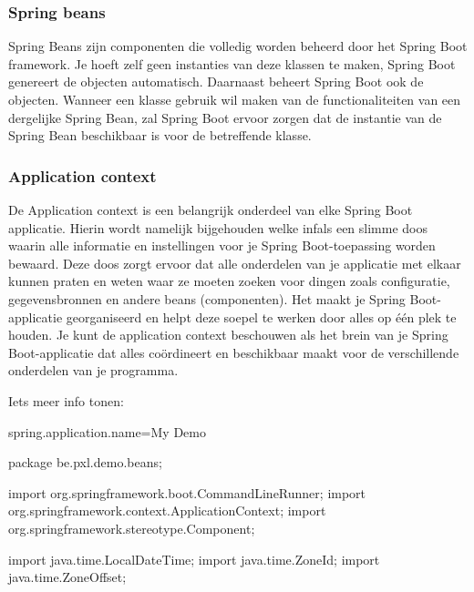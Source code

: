 \subsubsection{Spring beans}

Spring Beans zijn componenten die volledig worden beheerd door het Spring Boot framework. Je hoeft zelf geen instanties van deze klassen te maken, Spring Boot genereert de objecten automatisch.  Daarnaast beheert Spring Boot ook de objecten. Wanneer een klasse gebruik wil maken van de functionaliteiten van een dergelijke Spring Bean, zal Spring Boot ervoor zorgen dat de instantie van de Spring Bean beschikbaar is voor de betreffende klasse.

\subsubsection{Application context}

De Application context is een belangrijk onderdeel van elke Spring Boot applicatie.
Hierin wordt namelijk bijgehouden welke infals een slimme doos waarin alle informatie en instellingen voor je Spring Boot-toepassing worden bewaard. Deze doos zorgt ervoor dat alle onderdelen van je applicatie met elkaar kunnen praten en weten waar ze moeten zoeken voor dingen zoals configuratie, gegevensbronnen en andere beans (componenten). Het maakt je Spring Boot-applicatie georganiseerd en helpt deze soepel te werken door alles op één plek te houden. Je kunt de application context beschouwen als het brein van je Spring Boot-applicatie dat alles coördineert en beschikbaar maakt voor de verschillende onderdelen van je programma.


Iets meer info tonen:

spring.application.name=My Demo

package be.pxl.demo.beans;

import org.springframework.boot.CommandLineRunner;
import org.springframework.context.ApplicationContext;
import org.springframework.stereotype.Component;

import java.time.LocalDateTime;
import java.time.ZoneId;
import java.time.ZoneOffset;

